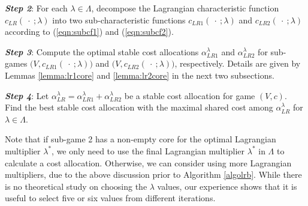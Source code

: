 \documentclass[ijoc,nonblindrev]{informs3} %
\begin{document}
\textbf{{\em Step 2}}: For each  $\lambda\in\Lambda$, decompose the Lagrangian characteristic function $c_{LR}(\ \cdot \ ;\lambda)$ into two sub-characteristic functions $c_{LR1}(\ \cdot \ ;\lambda)$ and $c_{LR2}(\ \cdot \ ;\lambda)$ according to (\ref{eqn:subcf1}) and (\ref{eqn:subcf2}). 

\textbf{{\em Step 3}}: Compute the optimal stable cost allocations $\alpha_{LR1}^{\lambda}$ and $\alpha_{LR2}^{\lambda}$ for  sub-games $\big(V,c_{LR1}(\ \cdot \ ;\lambda)\big)$ and $\big(V,c_{LR2}(\ \cdot \ ;\lambda)\big)$, respectively. Details are given by Lemmas \ref{lemma:lr1core} and \ref{lemma:lr2core} in the next two subsections.

\textbf{{\em Step 4}}: Let $\alpha_{LR}^{\lambda} = \alpha_{LR1}^{\lambda} + \alpha_{LR2}^{\lambda}$ be a stable cost allocation for game $ (V,c)$. Find the best stable cost allocation  with the maximal shared cost among $\alpha_{LR}^{\lambda}$ for  $\lambda\in\Lambda$.

Note that if sub-game 2 has a non-empty core for the optimal Lagrangian multiplier $\lambda^*$,  we only need to use the final Lagrangian multiplier $\lambda^*$ in $\Lambda$ to calculate a cost allocation. 
Otherwise, we can consider using more Lagrangian multipliers, due to the above discussion prior to Algorithm \ref{algolrb}. While there is no theoretical study on choosing the $\lambda$ values, our experience shows that it is useful to select five or six values from different iterations.
\end{document}
